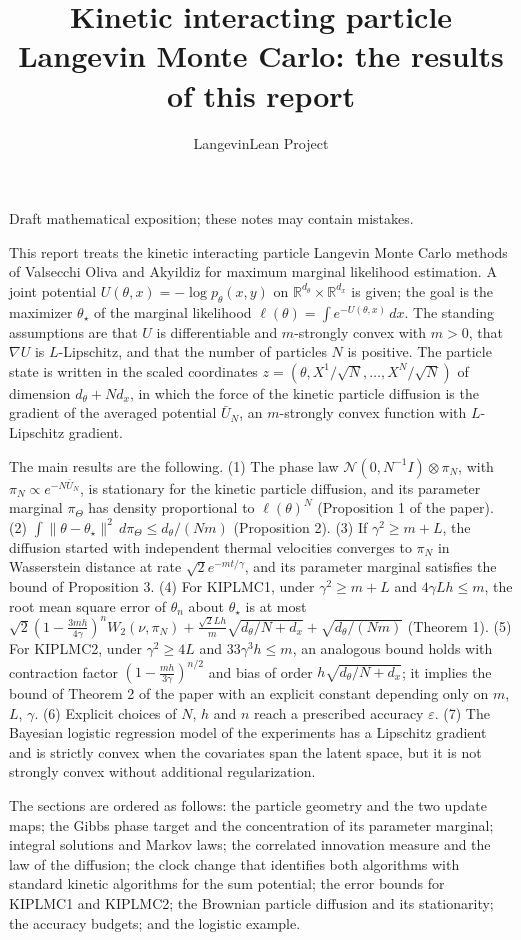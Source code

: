 \documentclass[11pt,a4paper]{article}
\title{\texorpdfstring{Kinetic interacting particle Langevin Monte Carlo: the results of this report}{Kinetic interacting particle Langevin Monte Carlo: the results of this report}}
\author{LangevinLean Project}
\date{}
\begin{document}
\maketitle
Draft mathematical exposition; these notes may contain mistakes.


This report treats the kinetic interacting particle Langevin Monte Carlo methods of Valsecchi Oliva and Akyildiz for maximum marginal likelihood estimation. A joint potential \(U(\theta,x)=-\log p_\theta(x,y)\) on \(\mathbb R^{d_\theta}\times\mathbb R^{d_x}\) is given; the goal is the maximizer \(\theta_\star\) of the marginal likelihood \(\ell(\theta)=\int e^{-U(\theta,x)}\,dx\). The standing assumptions are that \(U\) is differentiable and \(m\)-strongly convex with \(m>0\), that \(\nabla U\) is \(L\)-Lipschitz, and that the number of particles \(N\) is positive. The particle state is written in the scaled coordinates \(z=(\theta,X^1/\sqrt N,\dots,X^N/\sqrt N)\) of dimension \(d_\theta+Nd_x\), in which the force of the kinetic particle diffusion is the gradient of the averaged potential \(\bar U_N\), an \(m\)-strongly convex function with \(L\)-Lipschitz gradient.




The main results are the following. (1) The phase law \(\mathcal N(0,N^{-1}I)\otimes\pi_N\), with \(\pi_N\propto e^{-N\bar U_N}\), is stationary for the kinetic particle diffusion, and its parameter marginal \(\pi_\Theta\) has density proportional to \(\ell(\theta)^N\) (Proposition 1 of the paper). (2) \(\int\|\theta-\theta_\star\|^2\,d\pi_\Theta\le d_\theta/(Nm)\) (Proposition 2). (3) If \(\gamma^2\ge m+L\), the diffusion started with independent thermal velocities converges to \(\pi_N\) in Wasserstein distance at rate \(\sqrt2e^{-mt/\gamma}\), and its parameter marginal satisfies the bound of Proposition 3. (4) For KIPLMC1, under \(\gamma^2\ge m+L\) and \(4\gamma Lh\le m\), the root mean square error of \(\theta_n\) about \(\theta_\star\) is at most \(\sqrt2(1-\frac{3mh}{4\gamma})^nW_2(\nu,\pi_N)+\frac{\sqrt2Lh}m\sqrt{d_\theta/N+d_x}+\sqrt{d_\theta/(Nm)}\) (Theorem 1). (5) For KIPLMC2, under \(\gamma^2\ge4L\) and \(33\gamma^3h\le m\), an analogous bound holds with contraction factor \((1-\frac{mh}{3\gamma})^{n/2}\) and bias of order \(h\sqrt{d_\theta/N+d_x}\); it implies the bound of Theorem 2 of the paper with an explicit constant depending only on \(m\), \(L\), \(\gamma\). (6) Explicit choices of \(N\), \(h\) and \(n\) reach a prescribed accuracy \(\varepsilon\). (7) The Bayesian logistic regression model of the experiments has a Lipschitz gradient and is strictly convex when the covariates span the latent space, but it is not strongly convex without additional regularization.




The sections are ordered as follows: the particle geometry and the two update maps; the Gibbs phase target and the concentration of its parameter marginal; integral solutions and Markov laws; the correlated innovation measure and the law of the diffusion; the clock change that identifies both algorithms with standard kinetic algorithms for the sum potential; the error bounds for KIPLMC1 and KIPLMC2; the Brownian particle diffusion and its stationarity; the accuracy budgets; and the logistic example.
\end{document}
